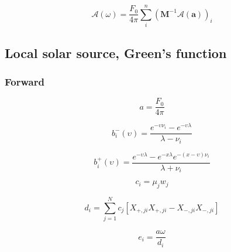 \begin{equation}
\mathcal{A}(\omega) = \frac{F_{0}}{4\pi} \sum^{n}_{i}(\mathbf{M}^{-1}\mathcal{A}(\mathbf{a}))_{i}
\label{eq:solar_source-local_solar_source-classical_reduced_order-adjoint_of_tangent_linear-p_p_0_a}
\end{equation}


%
\subsection{Local solar source, Green's function}
\label{sec:solar_source-local_solar_source-greens_function}


\subsubsection{Forward}
\label{sec:solar_source-local_solar_source-greens_function_forward}

\begin{equation}
a = \frac{F_{0}}{4 \pi}
\label{eq:solar_source-local_solar_source-greens_function_forward-a}
\end{equation}

\begin{equation}
b^{-}_{i}(\upsilon) = \frac{e^{-\upsilon \nu_{i}} - e^{-\upsilon \lambda}}{\lambda - \nu_{i}}
\label{eq:solar_source-local_solar_source-greens_function_forward-b_m}
\end{equation}

\begin{equation}
b^{+}_{i}(\upsilon) = \frac{e^{-\upsilon \lambda} - e^{-x \lambda}e^{-(x - \upsilon)\nu_{i}}}{\lambda + \nu_{i}}
\label{eq:solar_source-local_solar_source-greens_function_forward-b_p}
\end{equation}

\begin{equation}
c_{i} = \mu_{j} w_{j}
\label{eq:solar_source-local_solar_source-greens_function_forward-c}
\end{equation}

\begin{equation}
d_{i} = \sum^{N}_{j = 1} c_{j} \left[X_{+,ji}X_{+,ji} - X_{-,ji}X_{-,ji}\right]
\label{eq:solar_source-local_solar_source-greens_function_forward-d}
\end{equation}

\begin{equation}
e_{i} = \frac{a \omega}{d_{i}}
\label{eq:solar_source-local_solar_source-greens_function_forward-e}
\end{equation}

